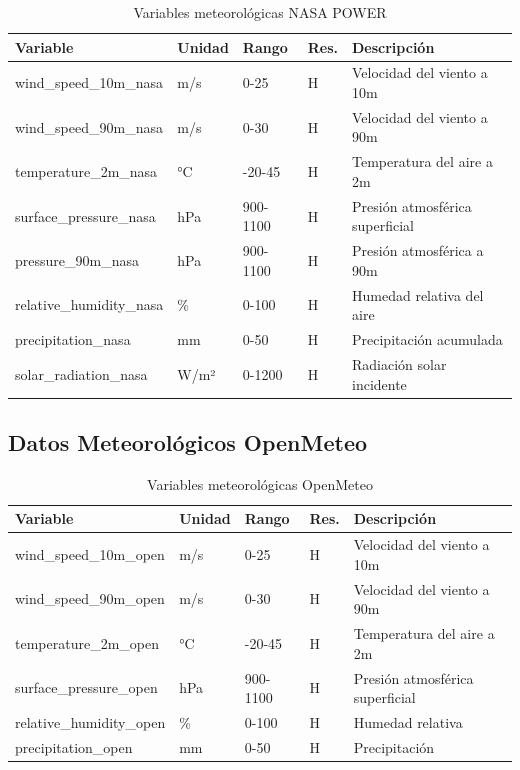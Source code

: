 \documentclass[conference]{IEEEtran}
\begin{document}
	\begin{table}[htbp]
		\centering
		\caption{Variables meteorológicas NASA POWER}
		\begin{tabular}{|p{2.5cm}|p{1.2cm}|p{1.4cm}|p{1cm}|p{3.5cm}|}
			\hline
			\textbf{Variable} & \textbf{Unidad} & \textbf{Rango} & \textbf{Res.} & \textbf{Descripción} \\
			\hline
			wind\_speed\_10m\_nasa & m/s & 0-25 & H & Velocidad del viento a 10m \\
			\hline
			wind\_speed\_90m\_nasa & m/s & 0-30 & H & Velocidad del viento a 90m \\
			\hline
			temperature\_2m\_nasa & °C & -20-45 & H & Temperatura del aire a 2m \\
			\hline
			surface\_pressure\_nasa & hPa & 900-1100 & H & Presión atmosférica superficial \\
			\hline
			pressure\_90m\_nasa & hPa & 900-1100 & H & Presión atmosférica a 90m \\
			\hline
			relative\_humidity\_nasa & \% & 0-100 & H & Humedad relativa del aire \\
			\hline
			precipitation\_nasa & mm & 0-50 & H & Precipitación acumulada \\
			\hline
			solar\_radiation\_nasa & W/m² & 0-1200 & H & Radiación solar incidente \\
			\hline
		\end{tabular}
		\label{tab:nasa_variables}
	\end{table}
	
	\vspace{0.5cm}
	
	\subsection{Datos Meteorológicos OpenMeteo}
	
	\begin{table}[htbp]
		\centering
		\caption{Variables meteorológicas OpenMeteo}
		\begin{tabular}{|p{2.5cm}|p{1.2cm}|p{1.4cm}|p{1cm}|p{3.5cm}|}
			\hline
			\textbf{Variable} & \textbf{Unidad} & \textbf{Rango} & \textbf{Res.} & \textbf{Descripción} \\
			\hline
			wind\_speed\_10m\_open & m/s & 0-25 & H & Velocidad del viento a 10m \\
			\hline
			wind\_speed\_90m\_open & m/s & 0-30 & H & Velocidad del viento a 90m \\
			\hline
			temperature\_2m\_open & °C & -20-45 & H & Temperatura del aire a 2m \\
			\hline
			surface\_pressure\_open & hPa & 900-1100 & H & Presión atmosférica superficial \\
			\hline
			relative\_humidity\_open & \% & 0-100 & H & Humedad relativa \\
			\hline
			precipitation\_open & mm & 0-50 & H & Precipitación \\
			\hline
		\end{tabular}
		\label{tab:openmeteo_variables}
	\end{table}
	
\end{document}
